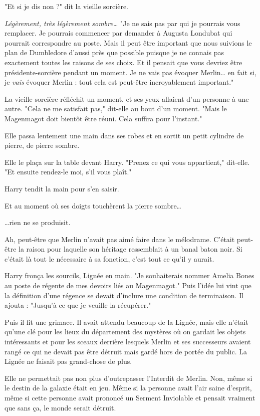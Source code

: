"Et si je dis non ?" dit la vieille sorcière.

\emph{Légèrement, très légèrement sombre…}  "Je ne sais pas par qui je pourrais vous remplacer. Je pourrais commencer par demander à Augusta Londubat qui pourrait correspondre au poste. Mais il peut être important que nous suivions le plan de Dumbledore d'aussi près que possible puisque je ne connais pas exactement toutes les raisons de ses choix. Et il pensait que vous devriez être présidente-sorcière pendant un moment. Je ne vais pas évoquer Merlin… en fait si, je \emph{vais}  évoquer Merlin : tout cela est peut-être incroyablement important."

La vieille sorcière réfléchit un moment, et ses yeux allaient d'un personne à une autre. "Cela ne me satisfait pas," dit-elle au bout d'un moment. "Mais le Magenmagot doit bientôt être réuni. Cela suffira pour l'instant."

Elle passa lentement une main dans ses robes et en sortit un petit cylindre de pierre, de pierre sombre.

Elle le plaça sur la table devant Harry. "Prenez ce qui vous appartient," dit-elle. "Et ensuite rendez-le moi, s'il vous plaît."

Harry tendit la main pour s'en saisir.

Et au moment où ses doigts touchèrent la pierre sombre…

…rien ne se produisit.

Ah, peut-être que Merlin n'avait pas aimé faire dans le mélodrame. C'était peut-être la raison pour laquelle son héritage ressemblait à un banal baton noir. Si c'était là tout le nécessaire à sa fonction, c'est tout ce qu'il y aurait.

Harry fronça les sourcils, Lignée en main. "Je souhaiterais nommer Amelia Bones au poste de régente de mes devoirs liés au Magenmagot." Puis l'idée lui vint que la définition d'une régence se devait d'inclure une condition de terminaison. Il ajouta : "Jusqu'à ce que je veuille la récupérer."

Puis il fit une grimace. Il avait attendu beaucoup de la Lignée, mais elle n'était qu'une clé pour les lieux du département des mystères où on gardait les objets intéressants et pour les sceaux derrière lesquels Merlin et ses successeurs avaient rangé ce qui ne devait pas être détruit mais gardé hors de portée du public. La Lignée ne faisait pas grand-chose de plus.

Elle ne permettait pas non plus d'outrepasser l'Interdit de Merlin. Non, même si le destin de la galaxie était en jeu. Même si la personne avait l'air saine d'esprit, même si cette personne avait prononcé un Serment Inviolable et pensait vraiment que sans ça, le monde serait détruit.

